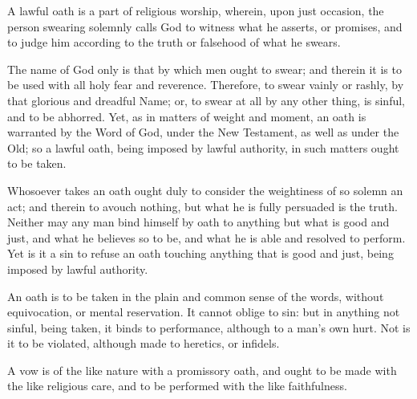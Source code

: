 \begin{outerlst}[left=0pt,labelsep=0pt]
\begin{innerlst}[resume*]
\item A lawful oath is a part of religious worship, wherein, upon just occasion, the person swearing solemnly calls God to witness what he asserts, or promises, and to judge him according to the truth or falsehood of what he swears.   

\item The name of God only is that by which men ought to swear; and therein it is to be used with all holy fear and reverence. Therefore, to swear vainly or rashly, by that glorious and dreadful Name; or, to swear at all by any other thing, is sinful, and to be abhorred. Yet, as in matters of weight and moment, an oath is warranted by the Word of God, under the New Testament, as well as under the Old; so a lawful oath, being imposed by lawful authority, in such matters ought to be taken.   

\item Whosoever takes an oath ought duly to consider the weightiness of so solemn an act; and therein to avouch nothing, but what he is fully persuaded is the truth. Neither may any man bind himself by oath to anything but what is good and just, and what he believes so to be, and what he is able and resolved to perform. Yet is it a sin to refuse an oath touching anything that is good and just, being imposed by lawful authority.   

\item An oath is to be taken in the plain and common sense of the words, without equivocation, or mental reservation. It cannot oblige to sin: but in anything not sinful, being taken, it binds to performance, although to a man's own hurt. Not is it to be violated, although made to heretics, or infidels.   

\item A vow is of the like nature with a promissory oath, and ought to be made with the like religious care, and to be performed with the like faithfulness.   


\end{innerlst}
\end{outerlst}
